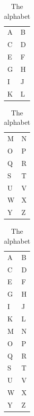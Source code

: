 \documentclass{article}
\begin{document}
\listoftables

\clearpage

\captionsetup[continuedfloat]{textformat=continued}

\begin{table}[!ht]
\caption{The alphabet}
\centering
\begin{tabular}{ll}
A & B \\
C & D \\
E & F \\
G & H \\
I & J \\
K & L \\
\end{tabular}
\end{table}

\begin{table}[!ht]
\continuedfloat
\caption[]{The alphabet}
\centering
\begin{tabular}{ll}
M & N \\
O & P \\
Q & R \\
S & T \\
U & V \\
W & X \\
Y & Z \\
\end{tabular}
\end{table}

\lipsum[1]
\lipsum[2]

\begin{longtable}{ll}
\caption{The alphabet}
\endfirsthead
\captionsetup{options=continuedfloat}
\caption[]{The alphabet}
\endhead
A & B \\
C & D \\
E & F \\
G & H \\
I & J \\
K & L \\
M & N \\
O & P \\
Q & R \\
S & T \\
U & V \\
W & X \\
Y & Z \\
\end{longtable}

\lipsum[1]

\clearpage
{}

\end{document}
